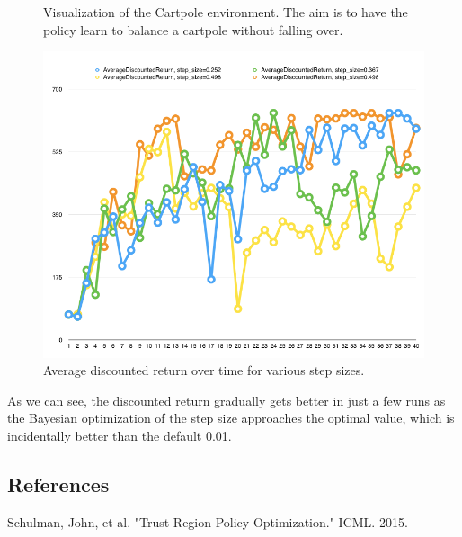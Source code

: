 \documentclass[final]{beamer}
\begin{document}
\begin{frame}[t]
\begin{multicols}{3}
\begin{figure}[h]
  \caption{Visualization of the Cartpole environment. The aim is to have the policy learn to balance a cartpole without falling over.}
\end{figure}


\begin{figure}[h]
  \includegraphics{results.png}

  \caption{Average discounted return over time for various step sizes.}
\end{figure}

As we can see, the discounted return gradually gets better in just a few runs as the Bayesian optimization of the step size approaches the optimal value, which is incidentally better than the default 0.01.



\subsection{References}

\begin{thebibliography}{99}

 Schulman, John, et al. "Trust Region Policy Optimization." ICML. 2015.


\end{thebibliography}
\end{multicols}
\end{frame}
\end{document}
